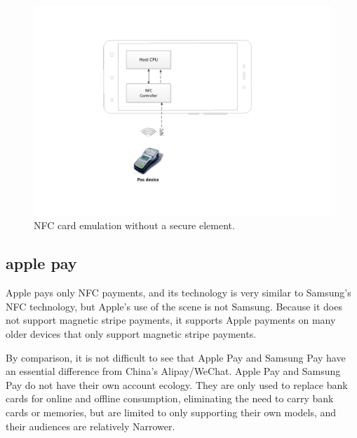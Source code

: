 \documentclass[journal]{IEEEtran}
\begin{document}
\begin{figure}[htbp]
\centerline{\includegraphics[scale=0.58]{NFC_cpu.pdf}}
\caption{NFC card emulation without a secure element.}
\label{fig}
\end{figure}

\subsection{apple pay}
Apple pays only NFC payments, and its technology is very similar to Samsung's NFC technology, but Apple's use of the scene is not Samsung. Because it does not support magnetic stripe payments, it supports Apple payments on many older devices that only support magnetic stripe payments.

By comparison, it is not difficult to see that Apple Pay and Samsung Pay have an essential difference from China’s Alipay/WeChat. Apple Pay and Samsung Pay do not have their own account ecology. They are only used to replace bank cards for online and offline consumption, eliminating the need to carry bank cards or memories, but are limited to only supporting their own models, and their audiences are relatively Narrower.
\end{document}
